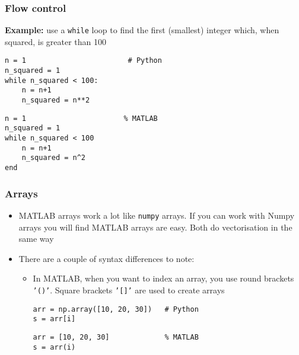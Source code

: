 \documentclass[english,14pt]{beamer}
\begin{document}

\begin{frame}[fragile]

\frametitle{Flow control}

\textbf{Example:} use a \texttt{while} loop to find the first (smallest) integer which, when squared, is greater than 100

\begin{lstlisting}[style=CStyle]
n = 1                        # Python
n_squared = 1
while n_squared < 100:
    n = n+1
    n_squared = n**2
\end{lstlisting}
\begin{lstlisting}[style=MStyle]
n = 1                       % MATLAB
n_squared = 1
while n_squared < 100
    n = n+1
    n_squared = n^2
end
\end{lstlisting} 
\end{frame}


\begin{frame}[fragile]

\frametitle{Arrays}

\begin{itemize}
	\item MATLAB arrays work a lot like \texttt{numpy} arrays. If you can work with Numpy arrays you will find MATLAB arrays are easy. Both do vectorisation in the same way
	\item There are a couple of syntax differences to note:
	\begin{itemize}
		\item In MATLAB, when you want to index an array, you use round brackets \texttt{'()'}. Square brackets \texttt{'[]'} are used to create arrays
\begin{lstlisting}[style=CStyle]
arr = np.array([10, 20, 30])   # Python
s = arr[i]
\end{lstlisting}
\begin{lstlisting}[style=MStyle]
arr = [10, 20, 30]             % MATLAB
s = arr(i)
\end{lstlisting}
    \end{itemize}
\end{itemize}

\end{frame}

\end{document}
